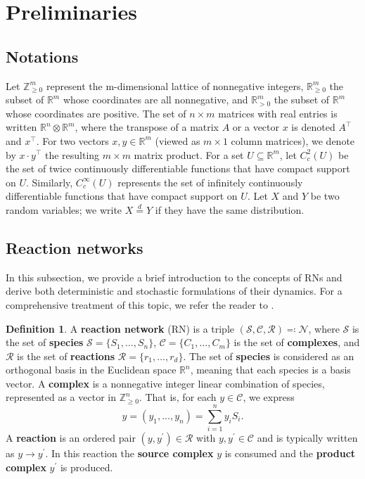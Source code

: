 \documentclass[10pt,a4paper]{amsart}
\theoremstyle{definition}
\newtheorem{definition}[theorem]{Definition}
\theoremstyle{remark}
\theoremstyle{consequence}
\def\p{^{\prime}}
\def\cN{\mathcal{N}}
\def\cR{\mathcal{R}}
\def\cS{\mathcal{S}}
\def\cC{\mathcal{C}}
\def\R{\mathbb{R}}
\def\Z{\mathbb{Z}}
\numberwithin{equation}{section}
\begin{document}
\section{Preliminaries}\label{RN_intro}

\subsection{Notations}
Let $\mathbb{Z}^m_{\geq 0}$ represent the m-dimensional lattice of nonnegative integers, $\mathbb{R}^m_{\geq 0}$ the subset of $\mathbb{R}^m$ whose coordinates are all nonnegative, and $\mathbb{R}^m_{> 0}$ the subset of $\mathbb{R}^m$ whose coordinates are positive.
The set of $n \times m$ matrices with real entries is written $\mathbb{R}^{n} \otimes \R^m$, where the transpose of a matrix $A$ or a vector $x$ is denoted $A^{\intercal}$ and $x^{\intercal}$. For two vectors $x, y \in \mathbb{R}^m$ (viewed as $m \times 1$ column matrices), we denote by $x \cdot y^{\intercal}$ the resulting $m \times m$ matrix product.
For a set $U \subseteq \mathbb{R}^m$, let 
$C_c ^2(U)$ be the set of twice continuously differentiable functions that have
compact support on $U$. Similarly, $C_c ^\infty(U)$ represents the set of infinitely continuously differentiable functions that have
compact support on $U$.
Let $X$ and $Y$ be two random variables; we write $X \overset{d}{=} Y$ if they have the same distribution.

\subsection{Reaction networks}

In this subsection, we provide a brief introduction to the concepts of RNs and derive both deterministic and stochastic formulations of their dynamics. For a comprehensive treatment of this topic, we refer the reader to \cite{anderson2015stochastic,feinberg2019foundations}.

\begin{definition}\cite{feinberg2019foundations}
    A \textbf{reaction network }(RN) is a triple $(\cS,\cC,\cR) \eqqcolon \cN$, where
 $\cS$ is the set of \textbf{species} $\cS=\{S_1,\dots,S_n\}$, $\cC = \{C_1, \dots, C_m\}$ is the set of \textbf{complexes}, and $\cR$ is the set of \textbf{reactions} $\cR=\{r_1,\dots,r_d\}$. The set of \textbf{species} is considered as an orthogonal basis in the Euclidean space $\R^n$, meaning that each species is a basis vector.  
 A \textbf{complex} is a nonnegative integer linear combination of species, represented as a vector in $\Z_{\geq 0}^n$. That is, for each $y \in \cC$, we express
\[
y = (y_1,\dots, y_n) = \sum_{i=1}^n y_i S_i.
\]
A \textbf{reaction} is an ordered pair $(y, y\p)\in \cR$ with $y,y\p\in\cC$ and is typically written as $y\to y\p $. In this reaction the \textbf{source complex} $y$ is consumed and the \textbf{product complex} $y\p$ is produced.
 \end{definition}
\end{document}
